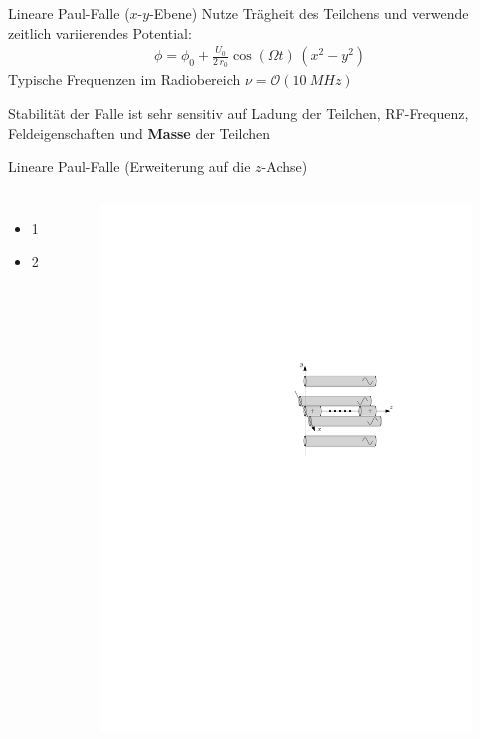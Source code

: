 \documentclass[12pt]{beamer}
\begin{document}
\begin{frame}{Lineare Paul-Falle ($x$-$y$-Ebene)}
	Nutze Trägheit des Teilchens und verwende zeitlich variierendes Potential:
	\begin{align}
		\phi = \phi_0 + \frac{U_0}{2 \, r_0} \cos(\Omega t) \, (x^2-y^2)
	\end{align}
	Typische Frequenzen im Radiobereich $\nu = \mathcal{O}(\SI{10}{MHz})$
	
	Stabilität der Falle ist sehr sensitiv auf Ladung der Teilchen, RF-Frequenz, Feldeigenschaften und \textbf{Masse} der Teilchen
\end{frame}

\begin{frame}{Lineare Paul-Falle (Erweiterung auf die $z$-Achse)}
	\begin{columns}[t]
		\begin{itemize}
			\item 1
			\item 2
		\end{itemize}
			\begin{figure}[h]
				\centering
				\includegraphics[width = 1\textwidth]{./figures/lineare_paulfalle.pdf}
			\end{figure}
	\end{columns}

\end{frame}
\end{document}
